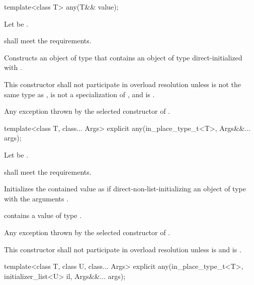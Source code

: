 %
\begin{itemdecl}
template<class T>
  any(T&& value);
\end{itemdecl}

\begin{itemdescr}
\pnum
Let  be .

\pnum
\requires
{} shall meet the  requirements.

\pnum
\effects
Constructs an object of type  that contains an object of type  direct-initialized with .

\pnum
\remarks
This constructor shall not participate in overload resolution unless
 is not the same type as ,
 is not a specialization of ,
and  is .

\pnum
\throws
Any exception thrown by the selected constructor of .
\end{itemdescr}

%
\begin{itemdecl}
template<class T, class... Args>
  explicit any(in_place_type_t<T>, Args&&... args);
\end{itemdecl}

\begin{itemdescr}
\pnum
Let  be .

\pnum
\requires {} shall meet the  requirements.

\pnum
\effects
Initializes the contained value as if direct-non-list-initializing an object of
type  with the arguments .

\pnum
\ensures
{} contains a value of type .

\pnum
\throws
Any exception thrown by the selected constructor of .

\pnum
\remarks
This constructor shall not participate in overload resolution unless
 is  and
 is .
\end{itemdescr}

%
\begin{itemdecl}
template<class T, class U, class... Args>
  explicit any(in_place_type_t<T>, initializer_list<U> il, Args&&... args);
\end{itemdecl}

